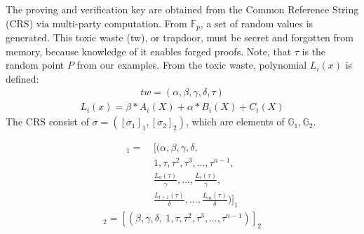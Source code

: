 The proving and verification key are obtained from the Common Reference String (CRS) via multi-party computation. From \begin{math}\mathbb{F}_p\end{math}, a set of random values is generated. This toxic waste (tw), or trapdoor, must be secret and forgotten from memory, because knowledge of it enables forged proofs. Note, that \begin{math}\tau\end{math} is the random point \(P\) from our examples. From the toxic waste, polynomial \(L_i(x)\) is defined:
\begin{align}
    tw = (\alpha, \beta, \gamma, \delta, \tau) 
\end{align}
\begin{align*}
    L_i(x) = \beta * A_i(X) + \alpha * B_i(X) + C_i(X)
\end{align*}
The CRS consist of \begin{math} \sigma = ([\sigma_1]_1,[\sigma_2]_2)\end{math}, which are elements of \begin{math} \mathbb{G}_1, \mathbb{G}_2\end{math}.

\begin{align}
    [\sigma_1]_1 = 
    &\ [(\alpha, \beta, \gamma, \delta, \\
    &\ 1, \tau, \tau^2, \tau^3, ..., \tau^{n-1}, \\
    &\ \frac{L_0(\tau)}{\gamma}, ..., \frac{L_l(\tau)}{\gamma}, \\
    &\ \frac{L_{l+1}(\tau)}{\delta}, ..., \frac{L_m(\tau)}{\delta})]_1 
\end{align}
\begin{align}
    [\sigma_2]_2 = [(\beta, \gamma, \delta, \ 1, \tau, \tau^2, \tau^3, ..., \tau^{n-1})]_2
\end{align}

